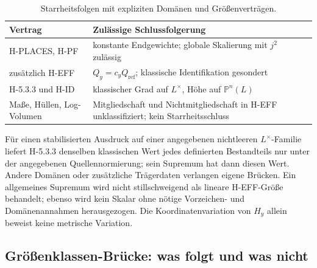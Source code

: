 \documentclass[11pt,a4paper]{article}
\theoremstyle{definition}
\theoremstyle{remark}
\begin{document}
\begin{table}[htbp]\centering\small
\caption{Starrheitsfolgen mit expliziten Domänen und Größenverträgen.}
\label{tab:rigidity-consequences}
\begin{tabularx}{\textwidth}{@{}>{\raggedright\arraybackslash}p{} >{\raggedright\arraybackslash}X@{}}
\toprule Vertrag & Zulässige Schlussfolgerung \\\midrule
H-PLACES, H-PF & konstante Endgewichte; globale Skalierung mit $j^2$ zulässig \\
zusätzlich H-EFF & $Q_y=c_yQ_{\mathrm{ref}}$; klassische Identifikation gesondert \\
H-5.3.3 und H-ID & klassischer Grad auf $L^\times$, Höhe auf $\mathbb P^n(L)$ \\
Maße, Hüllen, Log-Volumen & Mitgliedschaft und Nichtmitgliedschaft in H-EFF unklassifiziert; kein Starrheitsschluss \\
\bottomrule\end{tabularx}\end{table}

Für einen stabilisierten Ausdruck auf einer angegebenen nichtleeren
$L^\times$-Familie liefert H-5.3.3 denselben klassischen Wert jedes
definierten Bestandteils nur unter der angegebenen Quellennormierung;
sein Supremum hat dann diesen Wert. Andere Domänen oder zusätzliche
Trägerdaten verlangen eigene Brücken. Ein allgemeines Supremum wird
nicht stillschweigend als lineare H-EFF-Größe behandelt; ebenso wird
kein Skalar ohne nötige Vorzeichen- und Domänenannahmen herausgezogen.
Die Koordinatenvariation von $H_y$ allein beweist keine metrische Variation.

\subsection{Größenklassen-Brücke: was folgt und was nicht}\label{sec:bridge}
\end{document}
